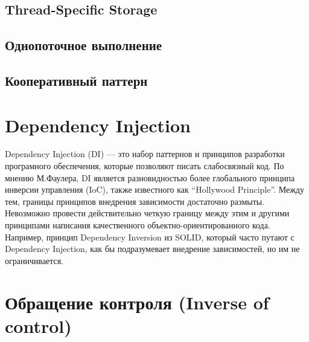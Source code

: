 \subsection{Thread-Specific Storage}
\subsection{Однопоточное выполнение}
\subsection{Кооперативный паттерн}

\section{Dependency Injection}
Dependency Injection (DI) — это набор паттернов и принципов разработки програмного обеспечения, которые позволяют писать слабосвязный код. По мнению М.Фаулера, DI является разновидностью более глобального принципа инверсии управления (IoC), также известного как “Hollywood Principle”. Между тем, границы принципов внедрения зависимости достаточно размыты. Невозможно провести действительно четкую границу между этим и другими принципами написания качественного объектно-ориентированного кода. Например, принцип Dependency Inversion из SOLID, который часто путают с Dependency Injection, как бы подразумевает внедрение зависимостей, но им не ограничивается.

\section{Обращение контроля (Inverse of control)}
